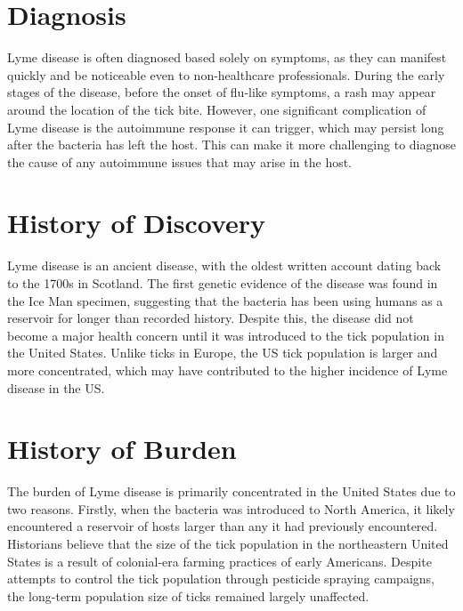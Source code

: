 \documentclass{report}
\begin{document}
\section{Diagnosis}
Lyme disease is often diagnosed based solely on symptoms, as they can manifest quickly and be noticeable even to non-healthcare professionals. During the early stages of the disease, before the onset of flu-like symptoms, a rash may appear around the location of the tick bite. However, one significant complication of Lyme disease is the autoimmune response it can trigger, which may persist long after the bacteria has left the host. This can make it more challenging to diagnose the cause of any autoimmune issues that may arise in the host.

\section{History of Discovery}
Lyme disease is an ancient disease, with the oldest written account dating back to the 1700s in Scotland. The first genetic evidence of the disease was found in the Ice Man specimen, suggesting that the bacteria has been using humans as a reservoir for longer than recorded history. Despite this, the disease did not become a major health concern until it was introduced to the tick population in the United States. Unlike ticks in Europe, the US tick population is larger and more concentrated, which may have contributed to the higher incidence of Lyme disease in the US.

\section{History of Burden}
The burden of Lyme disease is primarily concentrated in the United States due to two reasons. Firstly, when the bacteria was introduced to North America, it likely encountered a reservoir of hosts larger than any it had previously encountered. Historians believe that the size of the tick population in the northeastern United States is a result of colonial-era farming practices of early Americans. Despite attempts to control the tick population through pesticide spraying campaigns, the long-term population size of ticks remained largely unaffected.
\end{document}
